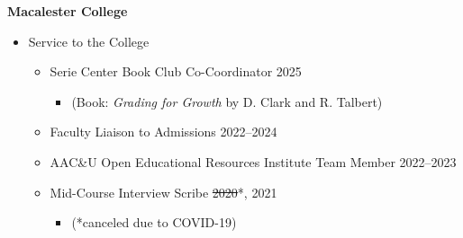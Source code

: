 \documentclass[margin]{res}
\begin{document}
\begin{resume}
\textbf{Macalester College}
	\begin{itemize} %
	\item Service to the College
		\begin{itemize}
		\item Serie Center Book Club Co-Coordinator  \hfill 2025
			\begin{itemize}[leftmargin=-0in] \vspace{-0.2cm}
			\item[] \begin{footnotesize}(Book: \textit{Grading for Growth} by D. Clark and R. Talbert) \end{footnotesize}
			\end{itemize} 
		\item Faculty Liaison to Admissions \hfill 2022--2024 %
		\item AAC\&U Open Educational Resources Institute Team Member \hfill 2022--2023
		\item Mid-Course Interview Scribe \hfill \sout{2020}*, 2021 
			\begin{itemize}[leftmargin=-0in] \vspace{-0.2cm}
			\item[] \begin{footnotesize} (*canceled due to COVID-19) \end{footnotesize}
			\end{itemize}
		\end{itemize}
		

\end{itemize}
\end{resume}
\end{document}
